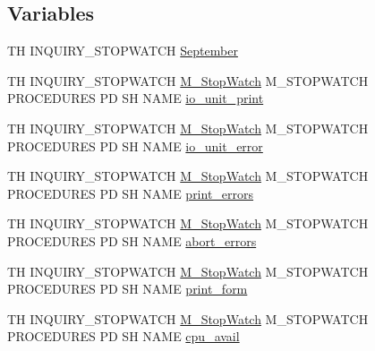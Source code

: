 \subsection*{Variables}
\begin{DoxyCompactItemize}
\item 
TH I\+N\+Q\+U\+I\+R\+Y\+\_\+\+S\+T\+O\+P\+W\+A\+T\+CH \hyperlink{inquiry__stopwatch_83_8txt_a5343cd7a514240c99a373cb1e09e1d08}{September}
\item 
TH I\+N\+Q\+U\+I\+R\+Y\+\_\+\+S\+T\+O\+P\+W\+A\+T\+CH \hyperlink{option__stopwatch_83_8txt_aa2011fc45a5e502e87ee50996a8a9305}{M\+\_\+\+Stop\+Watch} M\+\_\+\+S\+T\+O\+P\+W\+A\+T\+CH P\+R\+O\+C\+E\+D\+U\+R\+ES PD SH N\+A\+ME \hyperlink{inquiry__stopwatch_83_8txt_ad67f5f613d63ccb3ff87efe190d2c9c1}{io\+\_\+unit\+\_\+print}
\item 
TH I\+N\+Q\+U\+I\+R\+Y\+\_\+\+S\+T\+O\+P\+W\+A\+T\+CH \hyperlink{option__stopwatch_83_8txt_aa2011fc45a5e502e87ee50996a8a9305}{M\+\_\+\+Stop\+Watch} M\+\_\+\+S\+T\+O\+P\+W\+A\+T\+CH P\+R\+O\+C\+E\+D\+U\+R\+ES PD SH N\+A\+ME \hyperlink{inquiry__stopwatch_83_8txt_a3a3ade1e4c01a51287544ea767e3512a}{io\+\_\+unit\+\_\+error}
\item 
TH I\+N\+Q\+U\+I\+R\+Y\+\_\+\+S\+T\+O\+P\+W\+A\+T\+CH \hyperlink{option__stopwatch_83_8txt_aa2011fc45a5e502e87ee50996a8a9305}{M\+\_\+\+Stop\+Watch} M\+\_\+\+S\+T\+O\+P\+W\+A\+T\+CH P\+R\+O\+C\+E\+D\+U\+R\+ES PD SH N\+A\+ME \hyperlink{inquiry__stopwatch_83_8txt_a70e15afb456eff58f321ed840953c7f5}{print\+\_\+errors}
\item 
TH I\+N\+Q\+U\+I\+R\+Y\+\_\+\+S\+T\+O\+P\+W\+A\+T\+CH \hyperlink{option__stopwatch_83_8txt_aa2011fc45a5e502e87ee50996a8a9305}{M\+\_\+\+Stop\+Watch} M\+\_\+\+S\+T\+O\+P\+W\+A\+T\+CH P\+R\+O\+C\+E\+D\+U\+R\+ES PD SH N\+A\+ME \hyperlink{inquiry__stopwatch_83_8txt_a3a9b41223396c066db320e657bd8cba4}{abort\+\_\+errors}
\item 
TH I\+N\+Q\+U\+I\+R\+Y\+\_\+\+S\+T\+O\+P\+W\+A\+T\+CH \hyperlink{option__stopwatch_83_8txt_aa2011fc45a5e502e87ee50996a8a9305}{M\+\_\+\+Stop\+Watch} M\+\_\+\+S\+T\+O\+P\+W\+A\+T\+CH P\+R\+O\+C\+E\+D\+U\+R\+ES PD SH N\+A\+ME \hyperlink{inquiry__stopwatch_83_8txt_a0a3b09cc37d1f592e66a07c0c8a31cba}{print\+\_\+form}
\item 
TH I\+N\+Q\+U\+I\+R\+Y\+\_\+\+S\+T\+O\+P\+W\+A\+T\+CH \hyperlink{option__stopwatch_83_8txt_aa2011fc45a5e502e87ee50996a8a9305}{M\+\_\+\+Stop\+Watch} M\+\_\+\+S\+T\+O\+P\+W\+A\+T\+CH P\+R\+O\+C\+E\+D\+U\+R\+ES PD SH N\+A\+ME \hyperlink{inquiry__stopwatch_83_8txt_a7abc42d907bf857b7ccd85e08a2698bf}{cpu\+\_\+avail}

\end{DoxyCompactItemize}
